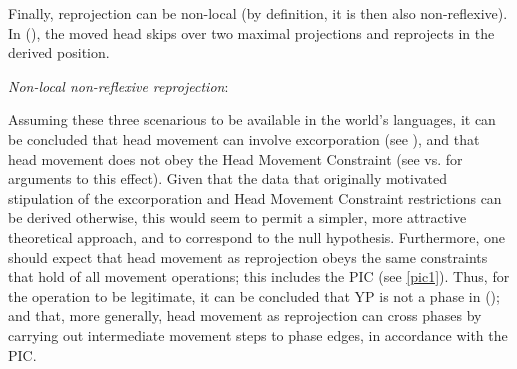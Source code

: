 \documentclass[output=paper
,modfonts
,nonflat]{langsci/langscibook}
\begin{document}
Finally, reprojection can be non-local (by definition, it is then also
non-reflexive). In (\Next), the moved head skips over two maximal
projections and reprojects in the derived position. 

\ea\label{ex:mueller:26}{\itshape Non-local \label{25}non-reflexive reprojection}:\\
\z

Assuming these three scenarious to be available in the world's
languages, it can be concluded that head movement can involve
excorporation (see \cite{Roberts:91,Roberts:97:res}), and that head
movement does not obey the Head Movement Constraint (see
\cite{Roberts:09:hea,Roberts:10} vs. \cite{Travis:84} for arguments to
this effect). Given that the data that originally motivated
stipulation of the excorporation and Head Movement Constraint
restrictions can be derived otherwise, this would seem to permit a
simpler, more attractive theoretical approach, and to correspond to
the null hypothesis. Furthermore, one should expect that head movement
as reprojection obeys the same constraints that hold of all movement
operations; this includes the PIC (see \ref{pic1}). Thus, for the
operation to be legitimate, it can be concluded that YP is not a phase
in (\Last); and that, more generally, head movement as reprojection can
cross phases by carrying out intermediate movement steps to phase
edges, in accordance with the PIC.
\end{document}
